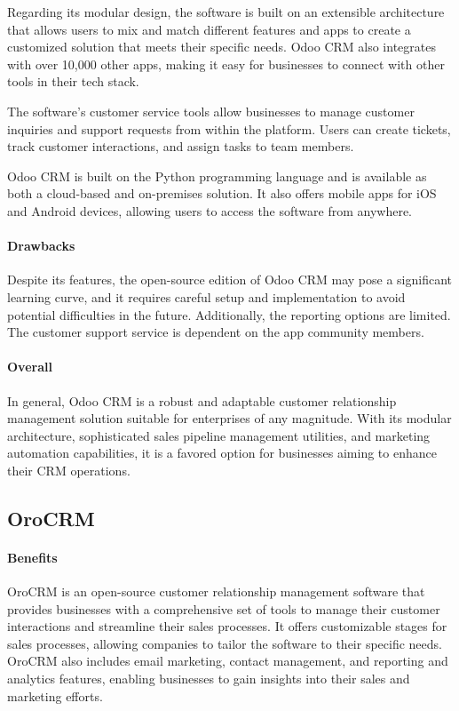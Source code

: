 \documentclass{article}
\begin{document}
Regarding its modular design, the software is built on an extensible architecture that allows users to mix and match different features and apps to create a customized solution that meets their specific needs. Odoo CRM also integrates with over 10,000 other apps, making it easy for businesses to connect with other tools in their tech stack.

The software's customer service tools allow businesses to manage customer inquiries and support requests from within the platform. Users can create tickets, track customer interactions, and assign tasks to team members.

Odoo CRM is built on the Python programming language and is available as both a cloud-based and on-premises solution. It also offers mobile apps for iOS and Android devices, allowing users to access the software from anywhere.

\paragraph{Drawbacks}

Despite its features, the open-source edition of Odoo CRM may pose a significant learning curve, and it requires careful setup and implementation to avoid potential difficulties in the future. Additionally, the reporting options are limited. The customer support service is dependent on the app community members.

\paragraph{Overall}

In general, Odoo CRM is a robust and adaptable customer relationship management solution suitable for enterprises of any magnitude. With its modular architecture, sophisticated sales pipeline management utilities, and marketing automation capabilities, it is a favored option for businesses aiming to enhance their CRM operations.

\subsection{OroCRM}

\paragraph{Benefits}

OroCRM is an open-source customer relationship management software that provides businesses with a comprehensive set of tools to manage their customer interactions and streamline their sales processes. It offers customizable stages for sales processes, allowing companies to tailor the software to their specific needs. OroCRM also includes email marketing, contact management, and reporting and analytics features, enabling businesses to gain insights into their sales and marketing efforts.
\end{document}
